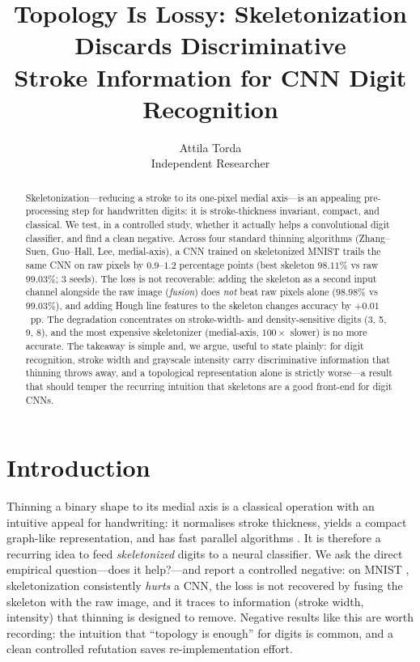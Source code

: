 \documentclass{article}
\title{Topology Is Lossy: Skeletonization Discards Discriminative\\
       Stroke Information for CNN Digit Recognition}
\author{%
  Attila Torda \\
  Independent Researcher \\
}
\begin{document}
\maketitle

\begin{abstract}
Skeletonization---reducing a stroke to its one-pixel medial axis---is an appealing
pre-processing step for handwritten digits: it is stroke-thickness invariant, compact, and
classical. We test, in a controlled study, whether it actually helps a convolutional digit
classifier, and find a clean negative. Across four standard thinning algorithms (Zhang--Suen,
Guo--Hall, Lee, medial-axis), a CNN trained on skeletonized MNIST trails the same CNN on raw
pixels by $0.9$--$1.2$ percentage points (best skeleton $98.11\%$ vs raw $99.03\%$; $3$ seeds).
The loss is not recoverable: adding the skeleton as a second input channel alongside the raw
image (\emph{fusion}) does \emph{not} beat raw pixels alone ($98.98\%$ vs $99.03\%$), and adding
Hough line features to the skeleton changes accuracy by $+0.01$~pp. The degradation concentrates
on stroke-width- and density-sensitive digits (3, 5, 9, 8), and the most expensive skeletonizer
(medial-axis, $100\times$ slower) is no more accurate. The takeaway is simple and, we argue,
useful to state plainly: for digit recognition, stroke width and grayscale intensity carry
discriminative information that thinning throws away, and a topological representation alone is
strictly worse---a result that should temper the recurring intuition that skeletons are a good
front-end for digit CNNs.
\end{abstract}

\section{Introduction}
Thinning a binary shape to its medial axis \cite{Blum1967} is a classical operation with an
intuitive appeal for handwriting: it normalises stroke thickness, yields a compact graph-like
representation, and has fast parallel algorithms \cite{ZhangSuen1984,GuoHall1989}. It is
therefore a recurring idea to feed \emph{skeletonized} digits to a neural classifier. We ask the
direct empirical question---does it help?---and report a controlled negative: on MNIST
\cite{LeCun1998}, skeletonization consistently \emph{hurts} a CNN, the loss is not recovered by
fusing the skeleton with the raw image, and it traces to information (stroke width, intensity)
that thinning is designed to remove. Negative results like this are worth recording: the
intuition that ``topology is enough'' for digits is common, and a clean controlled refutation
saves re-implementation effort.
\end{document}
